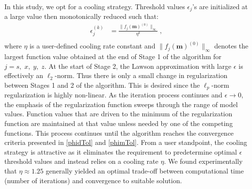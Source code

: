 \documentclass[extra,referee]{gji}
\begin{document}
In this study, we opt for a cooling strategy. Threshold values $\epsilon_j$'s are initialized at a large value then monotonically reduced such that:
\begin{equation}
\begin{split}
\epsilon_j^{(k)} &=\frac{\|f_j({\mathbf{m}})^{(0)}\|_\infty}{\eta^k}\;,\\
\end{split}
\end{equation}
where $\eta$ is a user-defined cooling rate constant and $\|f_j({\mathbf{m}})^{(0)}\|_\infty$ denotes the largest function value obtained at the end of Stage 1 of the algorithm for $j=s,\;x,\;y,\;z$.
At the start of Stage 2, the Lawson approximation with large $\epsilon$ is effectively an $\ell_2$-norm. Thus there is only a small change in regularization between Stages 1 and 2 of the algorithm.
This is desired since the $\ell_p$-norm regularization is highly non-linear. As the iteration process continues and $\epsilon \rightarrow 0$, the emphasis of the regularization function sweeps through the range of model values.
Function values that are driven to the minimum of the regularization function are maintained at that value unless needed by one of the competing functions. This process continues until the algorithm reaches the convergence criteria presented in \eqref{phidTol} and \eqref{phimTol}.
From a user standpoint, the cooling strategy is attractive as it eliminates the requirement to predetermine optimal $\epsilon$ threshold values and instead relies on a cooling rate $\eta$.
We found experimentally that $\eta \approx 1.25$ generally yielded an optimal trade-off between computational time (number of iterations) and convergence to suitable solution.
\end{document}
